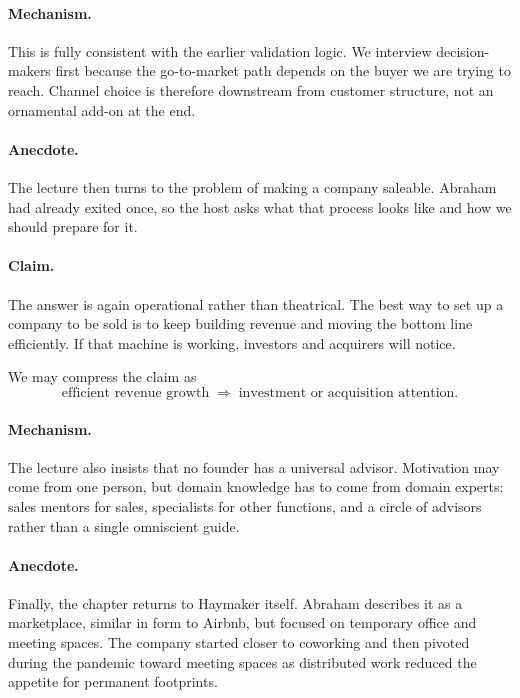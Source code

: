 \paragraph{Mechanism.} This is fully consistent with the earlier validation logic. We interview decision-makers first because the go-to-market path depends on the buyer we are trying to reach. Channel choice is therefore downstream from customer structure, not an ornamental add-on at the end.

\paragraph{Anecdote.} The lecture then turns to the problem of making a company saleable. Abraham had already exited once, so the host asks what that process looks like and how we should prepare for it.

\paragraph{Claim.} The answer is again operational rather than theatrical. The best way to set up a company to be sold is to keep building revenue and moving the bottom line efficiently. If that machine is working, investors and acquirers will notice.

We may compress the claim as
\begin{equation}
\text{efficient revenue growth}
\;\Rightarrow\;
\text{investment or acquisition attention}.
\end{equation}

\paragraph{Mechanism.} The lecture also insists that no founder has a universal advisor. Motivation may come from one person, but domain knowledge has to come from domain experts: sales mentors for sales, specialists for other functions, and a circle of advisors rather than a single omniscient guide.

\paragraph{Anecdote.} Finally, the chapter returns to Haymaker itself. Abraham describes it as a marketplace, similar in form to Airbnb, but focused on temporary office and meeting spaces. The company started closer to coworking and then pivoted during the pandemic toward meeting spaces as distributed work reduced the appetite for permanent footprints.

